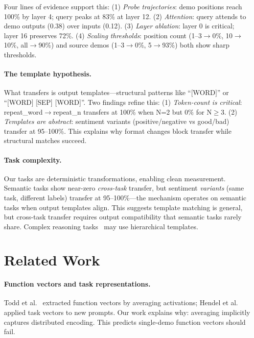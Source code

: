 \documentclass[runningheads]{llncs}
\begin{document}
Four lines of evidence support this: (1) \emph{Probe trajectories}: demo positions reach 100\% by layer 4; query peaks at 83\% at layer 12. (2) \emph{Attention}: query attends to demo outputs (0.38) over inputs (0.12). (3) \emph{Layer ablation}: layer 0 is critical; layer 16 preserves 72\%. (4) \emph{Scaling thresholds}: position count (1--3$\to$0\%, 10$\to$10\%, all$\to$90\%) and source demos (1--3$\to$0\%, 5$\to$93\%) both show sharp thresholds.

\paragraph{The template hypothesis.}
What transfers is output templates---structural patterns like ``[WORD]'' or ``[WORD] [SEP] [WORD]''. Two findings refine this: (1) \emph{Token-count is critical}: repeat\_word$\to$repeat\_n transfers at 100\% when N=2 but 0\% for N$\geq$3. (2) \emph{Templates are abstract}: sentiment variants (positive/negative vs good/bad) transfer at 95--100\%. This explains why format changes block transfer while structural matches succeed.

\paragraph{Task complexity.}
Our tasks are deterministic transformations, enabling clean measurement. Semantic tasks show near-zero \emph{cross-task} transfer, but sentiment \emph{variants} (same task, different labels) transfer at 95--100\%---the mechanism operates on semantic tasks when output templates align. This suggests template matching is general, but cross-task transfer requires output compatibility that semantic tasks rarely share. Complex reasoning tasks~\cite{wei2022chain} may use hierarchical templates.

\section{Related Work}
\label{sec:related}

\paragraph{Function vectors and task representations.}
Todd et al.~\cite{todd2023function} extracted function vectors by averaging activations; Hendel et al.~\cite{hendel2023context} applied task vectors to new prompts. Our work explains why: averaging implicitly captures distributed encoding. This predicts single-demo function vectors should fail.
\end{document}

